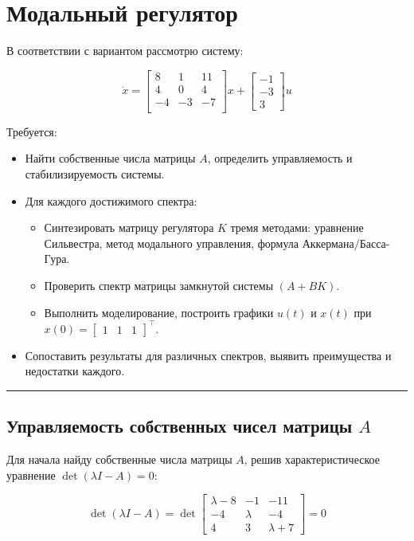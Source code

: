 \documentclass[a4paper,12pt]{article}
\begin{document}
\newpage
\section{Модальный регулятор}
\label{sec:task1}

В соответствии с вариантом рассмотрю систему:

\[
\dot{x} = 
\begin{bmatrix}
	8 & 1 & 11 \\
	4 & 0 & 4 \\
	-4 & -3 & -7 \\
\end{bmatrix} x + 
\begin{bmatrix}
	-1 \\ -3 \\ 3
\end{bmatrix} u
\]

Требуется:

\begin{itemize}
	\item Найти собственные числа матрицы $A$, определить управляемость и стабилизируемость системы.
	\item Для каждого достижимого спектра:
	\begin{itemize}
		\item Синтезировать матрицу регулятора $K$ тремя методами: уравнение Сильвестра, метод модального управления, формула Аккермана\(/\)Басса-Гура.
		\item Проверить спектр матрицы замкнутой системы $(A + BK)$.
		\item Выполнить моделирование, построить графики $u(t)$ и $x(t)$ при $x(0) = \begin{bmatrix} 1 & 1 & 1 \end{bmatrix}^\top$.
	\end{itemize}
	\item Сопоставить результаты для различных спектров, выявить преимущества и недостатки каждого.
\end{itemize}

\hrule \newpage

\subsection{Управляемость собственных чисел матрицы \(A\)}

Для начала найду собственные числа матрицы $A$, решив характеристическое уравнение $\det(\lambda I - A) = 0$:

\[
\det(\lambda I - A) =
\det\begin{bmatrix}
	\lambda - 8 & -1 & -11 \\
	-4 & \lambda & -4 \\
	4 & 3 & \lambda + 7
\end{bmatrix} = 0
\]
\end{document}
